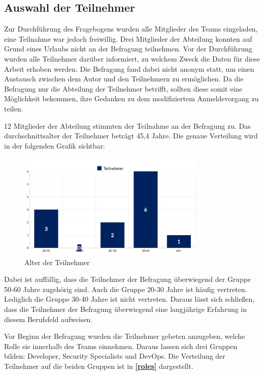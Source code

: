 \subsection{Auswahl der Teilnehmer}
Zur Durchführung des Fragebogens wurden alle Mitglieder des Teams eingeladen, eine Teilnahme war jedoch freiwillig. Drei Mitglieder der Abteilung konnten auf Grund eines Urlaubs nicht an der Befragung teilnehmen. Vor der Durchführung wurden alle Teilnehmer darüber informiert, zu welchem Zweck die Daten für diese Arbeit erhoben werden. Die Befragung fand dabei nicht anonym statt, um einen Austausch zwischen dem Autor und den Teilnehmern zu ermöglichen. Da die Befragung nur die Abteilung der Teilnehmer betrifft, sollten diese somit eine Möglichkeit bekommen, ihre Gedanken zu dem modifiziertem Anmeldevorgang zu teilen.

12 Mitglieder der Abteilung stimmten der Teilnahme an der Befragung zu. Das durchschnittsalter der Teilnehmer beträgt 45,4 Jahre. Die genaue Verteilung wird in der folgenden Grafik sichtbar:

\begin{figure}[H]
	\centering 
	\includegraphics[width=0.8\textwidth]{img/abbildungen/chart-2.png}
	\captionsetup{format=hang}
	\caption{Alter der Teilnehmer}
\end{figure}

Dabei ist auffällig, dass die Teilnehmer der Befragung überwiegend der Gruppe 50-60 Jahre zugehörig sind. Auch die Gruppe 20-30 Jahre ist häufig vertreten. Lediglich die Gruppe 30-40 Jahre ist nicht vertreten. Daraus lässt sich schließen, dass die Teilnehmer der Befragung überwiegend eine langjährige Erfahrung in diesem Berufsfeld aufweisen. 

Vor Beginn der Befragung wurden die Teilnehmer gebeten anzugeben, welche Rolle sie innerhalb des Teams einnehmen. Daraus lassen sich drei Gruppen bilden: Developer, Security Specialists und DevOps. Die Verteilung der Teilnehmer auf die beiden Gruppen ist in \textbf{\ref{roles}} dargestellt.

